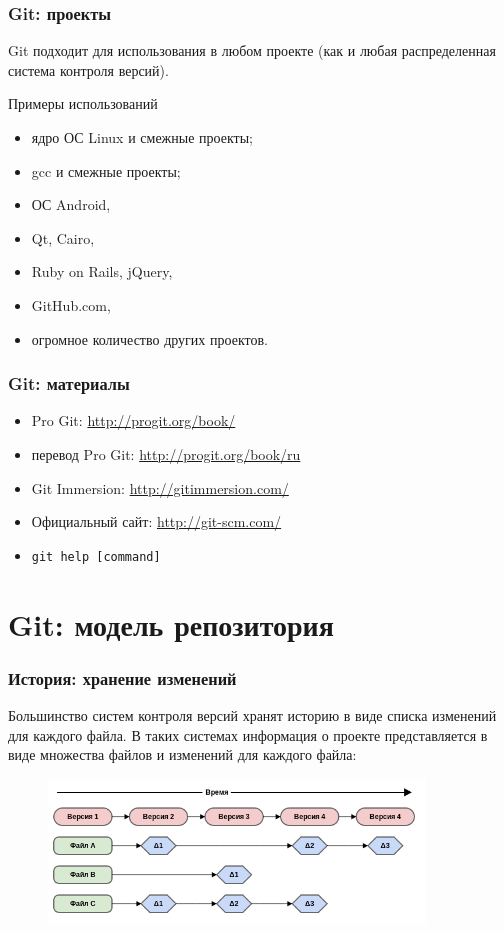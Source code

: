 \documentclass{beamer}
\begin{document}
\begin{frame}
  \frametitle{Git: проекты}
  Git подходит для использования в любом проекте (как и любая
  распределенная система контроля версий).

  \begin{block}{Примеры использований}
    \begin{itemize}
      \item ядро ОС Linux и смежные проекты;
      \item gcc и смежные проекты;
      \item ОС Android,
      \item Qt, Cairo,
      \item Ruby on Rails, jQuery,
      \item GitHub.com,
      \item огромное количество других проектов.
    \end{itemize}
  \end{block}
\end{frame}

\begin{frame}
  \frametitle{Git: материалы}

  \begin{itemize}
    \item Pro Git: \url{http://progit.org/book/}
    \item перевод Pro Git: \url{http://progit.org/book/ru}
    \item Git Immersion: \url{http://gitimmersion.com/}
    \item Официальный сайт: \url{http://git-scm.com/}
    \item \texttt{git help [command]}
  \end{itemize}
\end{frame}

\section{Git: модель репозитория}

\begin{frame}
  \frametitle{История: хранение изменений}
  Большинство систем контроля версий хранят историю в виде списка
  изменений для каждого файла. В таких системах информация о проекте
  представляется в виде множества файлов и изменений для каждого файла:

  \begin{figure}
     \includegraphics[width=10cm]{images/history-deltas.png}
  \end{figure}
\end{frame}
\end{document}
